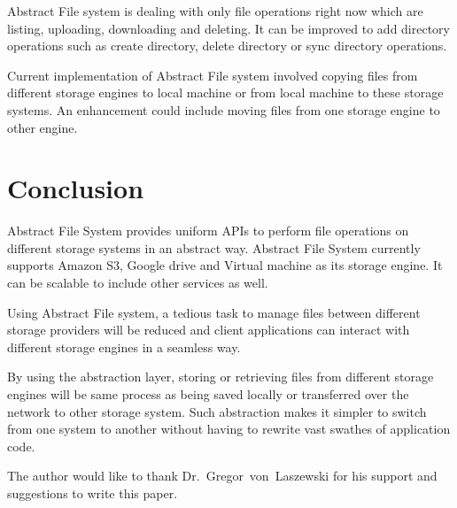 Abstract File system is dealing with only file operations right now which are 
listing, uploading, downloading and deleting. It can be improved to add 
directory operations such as create directory, delete directory or sync 
directory operations. 


Current implementation of Abstract File system involved copying files from 
different storage engines to local machine or from local machine to these 
storage systems. An enhancement could include moving files from one storage 
engine to other engine. 



\section{Conclusion}
Abstract File System provides uniform APIs to perform file operations on 
different storage systems in an abstract way. Abstract File System currently 
supports Amazon S3, Google drive and Virtual machine as its storage engine. It 
can be scalable to include other services as well. 


Using Abstract File system, a tedious task to manage files between different 
storage providers will be reduced and client applications can interact with 
different storage engines in a seamless way. 


By using the abstraction layer, storing or retrieving files from different 
storage engines will be same process as being saved locally or transferred 
over the network to other storage system. Such abstraction makes it simpler to 
switch from one system to another without having to rewrite vast swathes of 
application code.




\begin{acks}

  The author would like to thank Dr.~Gregor~von~Laszewski for his
  support and suggestions to write this paper.

\end{acks}


 

